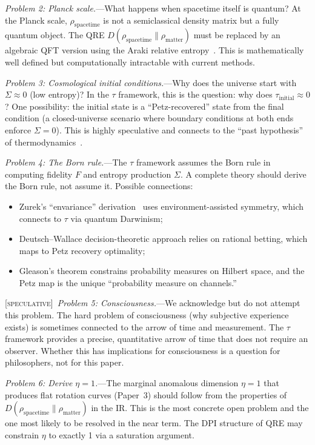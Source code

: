 \documentclass[prl,twocolumn,superscriptaddress,longbibliography,floatfix]{revtex4-2}
\newcommand{\tauasym}{\tau}
\newcommand{\spec}{\textsc{[speculative]}}
\begin{document}
\emph{Problem 2: Planck scale.}---What happens when
spacetime itself is quantum? At the Planck scale,
$\rho_{\mathrm{spacetime}}$ is not a semiclassical density
matrix but a fully quantum object. The QRE
$D(\rho_{\mathrm{spacetime}} \| \rho_{\mathrm{matter}})$ must
be replaced by an algebraic QFT version using the Araki
relative entropy~\cite{Araki1976}. This is mathematically
well defined but computationally intractable with current
methods.

\emph{Problem 3: Cosmological initial conditions.}---Why does
the universe start with $\Sigma \approx 0$ (low entropy)?
In the $\tauasym$ framework, this is the question: why does
$\tauasym_{\mathrm{initial}} \approx 0$? One possibility:
the initial state is a ``Petz-recovered'' state from the
final condition (a closed-universe scenario where boundary
conditions at both ends enforce $\Sigma = 0$). This is
highly speculative and connects to the ``past hypothesis''
of thermodynamics~\cite{Albert2000,Carroll2010}.

\emph{Problem 4: The Born rule.}---The $\tauasym$ framework
assumes the Born rule in computing fidelity $F$ and entropy
production $\Sigma$. A complete theory should derive the
Born rule, not assume it. Possible connections:
\begin{itemize}
\item Zurek's ``envariance'' derivation~\cite{Zurek2005}
  uses environment-assisted symmetry, which connects to
  $\tauasym$ via quantum Darwinism;
\item Deutsch--Wallace decision-theoretic approach relies
  on rational betting, which maps to Petz recovery
  optimality;
\item Gleason's theorem constrains probability measures on
  Hilbert space, and the Petz map is the unique ``probability
  measure on channels.''
\end{itemize}

\spec\ \emph{Problem 5: Consciousness.}---We acknowledge but do
not attempt this problem. The hard problem of consciousness
(why subjective experience exists) is sometimes connected to
the arrow of time and measurement. The $\tauasym$ framework
provides a precise, quantitative arrow of time that does not
require an observer. Whether this has implications for
consciousness is a question for philosophers, not for this paper.

\emph{Problem 6: Derive $\eta = 1$.}---The marginal anomalous
dimension $\eta = 1$ that produces flat rotation curves
(Paper~3) should follow from the properties of
$D(\rho_{\mathrm{spacetime}} \| \rho_{\mathrm{matter}})$ in
the IR. This is the most concrete open problem and the one
most likely to be resolved in the near term. The DPI
structure of QRE may constrain $\eta$ to exactly 1 via
a saturation argument.
\end{document}
